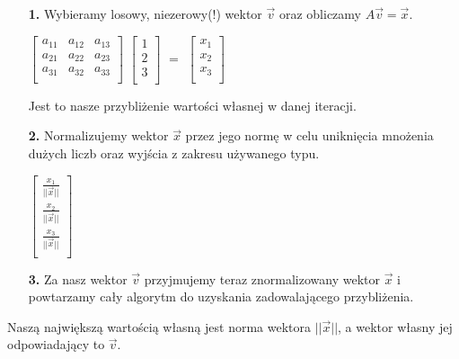 \documentclass{article}
\begin{document}
\begin{enumerate}
    \begin{enumerate}
      \item[\bf{1.}] Wybieramy losowy, niezerowy(!) wektor \textit{$\vec{v}$} oraz obliczamy $A\vec{v} = \vec{x}$.
      \begin{center}
        $\begin{bmatrix}
          a_{11} & a_{12} & a_{13}  \\
          a_{21} & a_{22} & a_{23}  \\
          a_{31} & a_{32} & a_{33} \\
        \end{bmatrix}$
        $\begin{bmatrix}
          1 \\
          2 \\
          3 \\
        \end{bmatrix}$
        $=$
        $\begin{bmatrix}
          x_1 \\
          x_2 \\
          x_3 \\
        \end{bmatrix}$
      \end{center}
      Jest to nasze przybliżenie wartości własnej w danej iteracji.
      \item[\bf{2.}] Normalizujemy wektor $\vec{x}$ przez jego normę w celu uniknięcia mnożenia dużych liczb oraz wyjścia z zakresu używanego typu.
      \begin{center}
        \large $\begin{bmatrix}
          \frac{x_1}{||\vec{x}||} \\
          \frac{x_2}{||\vec{x}||} \\
          \frac{x_3}{||\vec{x}||} \\
        \end{bmatrix}$
      \end{center}
      \item[\bf{3.}] Za nasz wektor $\vec{v}$ przyjmujemy teraz znormalizowany wektor $\vec{x}$ i powtarzamy cały algorytm do uzyskania zadowalającego przybliżenia.
    \end{enumerate}
    Naszą największą wartością własną jest norma wektora $||\vec{x}||$, a wektor własny jej odpowiadający to $\vec{v}$.
  \end{enumerate}
\end{document}
